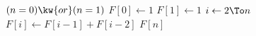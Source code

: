 \begin{codebox}
\li \If $(n = 0) \kw{ or }(n = 1)$
\li	\Then
	\End
\li	$F[0] \gets 1$
\li	$F[1] \gets 1$ 
\li \For $i \gets 2 \To n$
\li \Do
		$F[i] \gets F[i-1] + F[i-2]$
	\End
\li \Return $F[n]$
\end{codebox}